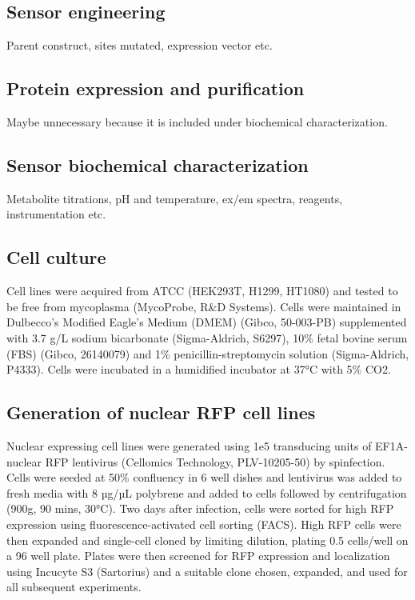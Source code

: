\documentclass[9pt,lineno]{elife}
\begin{document}
\subsection{Sensor engineering}
Parent construct, sites mutated, expression vector etc.


\subsection{Protein expression and purification}
Maybe unnecessary because it is included under biochemical characterization.


\subsection{Sensor biochemical characterization}
Metabolite titrations, pH and temperature, ex/em spectra, reagents, instrumentation etc.





\subsection{Cell culture}
Cell lines were acquired from ATCC (HEK293T, H1299, HT1080) and tested to be free from mycoplasma (MycoProbe, R\&D Systems).
Cells were maintained in Dulbecco’s Modified Eagle’s Medium (DMEM) (Gibco, 50-003-PB) supplemented with 3.7 g/L sodium bicarbonate (Sigma-Aldrich, S6297), 10\% fetal bovine serum (FBS) (Gibco, 26140079) and 1\% penicillin-streptomycin solution (Sigma-Aldrich, P4333).
Cells were incubated in a humidified incubator at 37°C with 5\% CO2.

\subsection{Generation of nuclear RFP cell lines}
Nuclear expressing cell lines were generated using 1e5 transducing units of EF1A-nuclear RFP lentivirus (Cellomics Technology, PLV-10205-50) by spinfection.
Cells were seeded at 50\% confluency in 6 well dishes and lentivirus was added to fresh media with 8 µg/µL polybrene and added to cells followed by centrifugation (900g, 90 mins, 30°C).
Two days after infection, cells were sorted for high RFP expression using fluorescence-activated cell sorting (FACS).
High RFP cells were then expanded and single-cell cloned by limiting dilution, plating 0.5 cells/well on a 96 well plate.
Plates were then screened for RFP expression and localization using Incucyte S3 (Sartorius) and a suitable clone chosen, expanded, and used for all subsequent experiments.
\end{document}
